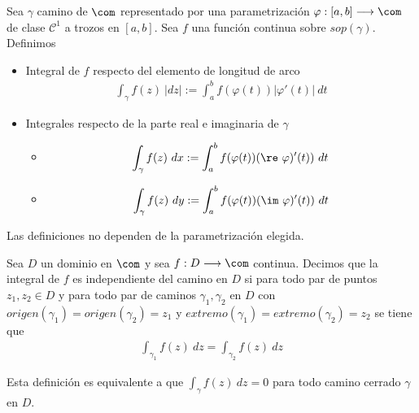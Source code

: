 \begin{defi}
Sea $\gamma$ camino de $\com$ representado por una parametrización $\varphi : [a,b] \longrightarrow \com$ de clase $\mathscr{C}^1$ a trozos en $[a,b]$. Sea $f$ una función continua sobre $sop(\gamma)$. Definimos
\begin{itemize}
    \item Integral de $f$ respecto del elemento de longitud de arco
    \begin{align*}
        \int_{\gamma}{f(z) \ |dz|} := \int_{a}^{b}{f(\varphi(t))|\varphi'(t)| \ dt}
    \end{align*}
    \item Integrales respecto de la parte real e imaginaria de $\gamma$
    \begin{itemize}
        \item 
        \begin{align*}
            \int_{\gamma}{f(z) \ dx} := \int_{a}^{b}{f(\varphi(t)) (\re \ \varphi)'(t)) \ dt}
        \end{align*}
        \item 
        \begin{align*}
            \int_{\gamma}{f(z) \ dy} := \int_{a}^{b}{f(\varphi(t)) (\im \ \varphi)'(t)) \ dt}
        \end{align*}
    \end{itemize}
\end{itemize}
\end{defi}

\begin{obs}
Las definiciones no dependen de la parametrización elegida.
\end{obs}

\begin{defi}
Sea $D$ un dominio en $\com$ y sea $f: D \longrightarrow \com$ continua. Decimos que la integral de $f$ es independiente del camino en $D$ si para todo par de puntos $z_1,z_2 \in D$ y para todo par de caminos $\gamma_1,\gamma_2$ en $D$ con $origen(\gamma_1) = origen(\gamma_2) = z_1$ y $extremo(\gamma_1) = extremo(\gamma_2) = z_2$ se tiene que
\begin{align*}
    \int_{\gamma_1}{f(z) \ dz} = \int_{\gamma_2}{f(z) \ dz}
\end{align*}
\end{defi}

\begin{obs}
Esta definición es equivalente a que $\int_{\gamma}{f(z) \ dz} = 0$ para todo camino cerrado $\gamma$ en $D$.
\end{obs}

